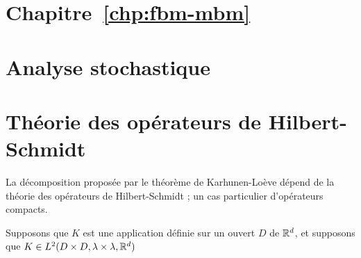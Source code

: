 \section{Chapitre~\ref{chp:fbm-mbm}}

\section{Analyse stochastique}
\label{sec\string:stochastic-analysis}

\begin{theoreme}
\end{theoreme}

\section{Théorie des opérateurs de Hilbert-Schmidt}
\label{sec\string:hilbert-operators}

La décomposition proposée par le théorème de Karhunen-Loève dépend de
la théorie des opérateurs de Hilbert-Schmidt ; un cas particulier
d'opérateurs compacts.

\begin{definition}
  Supposons que $K$ est une application définie sur un ouvert $D$ de $\mathbb{R}^d$, et supposons que $K\in L^2(D\times D, \lambda\times\lambda, \mathbb{R}^d)$
\end{definition}

